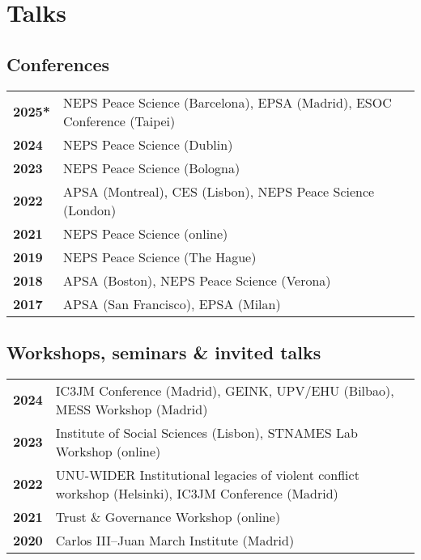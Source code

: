 \documentclass[a4paper, 12pt]{article}
\begin{document}
\section*{Talks}

\subsection*{Conferences}


\begin{tabular}{lp{15cm}}
\textbf{2025*} & NEPS Peace Science (Barcelona), EPSA (Madrid), ESOC Conference (Taipei) \\
\textbf{2024} & NEPS Peace Science (Dublin) \\
\textbf{2023} & NEPS Peace Science (Bologna) \\
\textbf{2022} & APSA (Montreal), CES (Lisbon), NEPS Peace Science (London) \\
\textbf{2021} & NEPS Peace Science (online) \\
\textbf{2019} & NEPS Peace Science (The Hague) \\
\textbf{2018} & APSA (Boston), NEPS Peace Science (Verona) \\
\textbf{2017} & APSA (San Francisco), EPSA (Milan) \\
\end{tabular}



\subsection*{Workshops, seminars \& invited talks}

\begin{tabular}{lp{15cm}}
\textbf{2024} & IC3JM Conference (Madrid), GEINK, UPV/EHU (Bilbao), MESS Workshop (Madrid) \\
\textbf{2023} & Institute of Social Sciences (Lisbon), STNAMES Lab Workshop (online) \\
\textbf{2022} & UNU-WIDER Institutional legacies of violent conflict workshop (Helsinki), IC3JM Conference (Madrid) \\
\textbf{2021} & Trust \& Governance Workshop (online) \\
\textbf{2020} & Carlos III--Juan March Institute (Madrid) \\
\end{tabular}
\end{document}
